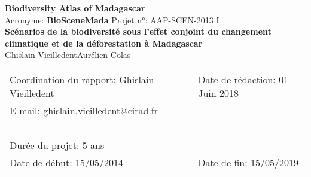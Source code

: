 \renewcommand{\bibsection}{}
\begin{center}
\vspace{1cm}
{\large
  \textbf{
    Biodiversity Atlas of Madagascar\\   
  }
}
\vspace{1cm}
Acronyme: \textbf{BioSceneMada} \hspace{2cm} Projet n°: AAP-SCEN-2013 I\\
\vspace{1cm}
{\Large \textbf{Scénarios de la biodiversité sous l'effet conjoint du changement climatique et de la déforestation à Madagascar}}\\
\vspace{1cm}
{\large 
  Ghislain Vieilledent\hspace{1cm}Aurélien Colas\\
}
\vspace{1cm}
\begin{tabular}{lcl}
Coordination du rapport: Ghislain Vieilledent & \hspace{1cm} & Date de rédaction: 01 Juin 2018\\
E-mail: ghislain.vieilledent@cirad.fr & \hspace{1cm} & ~ \\ 
~ & ~ \\
Durée du projet: 5 ans & \hspace{1cm} & ~ \\
Date de début: 15/05/2014 & \hspace{1cm} & Date de fin: 15/05/2019\\
\end{tabular}
\end{center}
\newpage